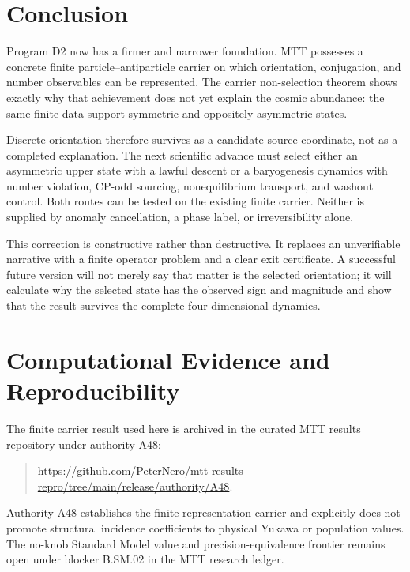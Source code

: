 \documentclass[11pt]{article}
\theoremstyle{definition}
\theoremstyle{remark}
\begin{document}
\section{Conclusion}

Program D2 now has a firmer and narrower foundation.  MTT possesses a concrete
finite particle--antiparticle carrier on which orientation, conjugation, and
number observables can be represented.  The carrier non-selection theorem
shows exactly why that achievement does not yet explain the cosmic abundance:
the same finite data support symmetric and oppositely asymmetric states.

Discrete orientation therefore survives as a candidate source coordinate,
not as a completed explanation.  The next scientific advance must select
either an asymmetric upper state with a lawful descent or a baryogenesis
dynamics with number violation, CP-odd sourcing, nonequilibrium transport,
and washout control.  Both routes can be tested on the existing finite
carrier.  Neither is supplied by anomaly cancellation, a phase label, or
irreversibility alone.

This correction is constructive rather than destructive.  It replaces an
unverifiable narrative with a finite operator problem and a clear exit
certificate.  A successful future version will not merely say that matter is
the selected orientation; it will calculate why the selected state has the
observed sign and magnitude and show that the result survives the complete
four-dimensional dynamics.

\section*{Computational Evidence and Reproducibility}
The finite carrier result used here is archived in the curated MTT results
repository under authority A48:
\begin{quote}\small\raggedright
\url{https://github.com/PeterNero/mtt-results-repro/tree/main/release/authority/A48}.
\end{quote}
Authority A48 establishes the finite representation carrier and explicitly
does not promote structural incidence coefficients to physical Yukawa or
population values.  The no-knob Standard Model value and precision-equivalence
frontier remains open under blocker B.SM.02 in the MTT research ledger.
\end{document}
